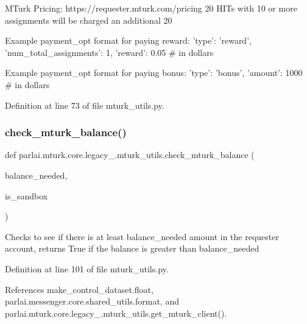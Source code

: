 \begin{DoxyVerb}MTurk Pricing: https://requester.mturk.com/pricing
20%
HITs with 10 or more assignments will be charged an additional
20%

Example payment_opt format for paying reward:
{
    'type': 'reward',
    'num_total_assignments': 1,
    'reward': 0.05  # in dollars
}

Example payment_opt format for paying bonus:
{
    'type': 'bonus',
    'amount': 1000  # in dollars
}
\end{DoxyVerb}
 

Definition at line 73 of file mturk\+\_\+utils.\+py.

\mbox{\label{namespaceparlai_1_1mturk_1_1core_1_1legacy__2018_1_1mturk__utils_a49df282ab2a8eb03654fdc7817187d6a}} 
\subsubsection{\texorpdfstring{check\+\_\+mturk\+\_\+balance()}{check\_mturk\_balance()}}
{\footnotesize\ttfamily def parlai.\+mturk.\+core.\+legacy\+\_.\+mturk\+\_\+utils.\+check\+\_\+mturk\+\_\+balance (\begin{DoxyParamCaption}\item[{}]{balance\+\_\+needed,  }\item[{}]{is\+\_\+sandbox }\end{DoxyParamCaption})}

\begin{DoxyVerb}Checks to see if there is at least balance_needed amount in the
requester account, returns True if the balance is greater than
balance_needed
\end{DoxyVerb}
 

Definition at line 101 of file mturk\+\_\+utils.\+py.



References make\+\_\+control\+\_\+dataset.\+float, parlai.\+messenger.\+core.\+shared\+\_\+utils.\+format, and parlai.\+mturk.\+core.\+legacy\+\_.\+mturk\+\_\+utils.\+get\+\_\+mturk\+\_\+client().

